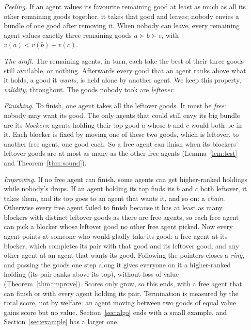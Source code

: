 \documentclass[runningheads,11pt]{llncs}
\begin{document}
\emph{Peeling.} If an agent values its favourite remaining good at least as much as all its other remaining goods together, it takes that good and leaves; nobody envies a bundle of one good after removing it. When nobody can leave, every remaining agent values exactly three remaining goods $a\succ b\succ c$, with $v(a)<v(b)+v(c)$.

\emph{The draft.} The remaining agents, in turn, each take the best of their three goods still available, or nothing. Afterwards every good that an agent ranks above what it holds, a good it \emph{wants}, is held alone by another agent. We keep this property, \emph{validity}, throughout. The goods nobody took are \emph{leftover}.

\emph{Finishing.} To finish, one agent takes all the leftover goods. It must be \emph{free}: nobody may want its good. The only agents that could still envy its big bundle are its \emph{blockers}: agents holding their top good $a$ whose $b$ and $c$ would both be in it. Each blocker is fixed by moving one of these two goods, which is leftover, to another free agent, one good each. So a free agent can finish when its blockers' leftover goods are at most as many as the other free agents (Lemma~\ref{lem:test} and Theorem~\ref{thm:sound}).

\emph{Improving.} If no free agent can finish, some agents can get higher-ranked holdings while nobody's drops. If an agent holding its top finds its $b$ and $c$ both leftover, it takes them, and its top goes to an agent that wants it, and so on: a \emph{chain}. Otherwise every free agent failed to finish because it has at least as many blockers with distinct leftover goods as there are free agents, so each free agent can pick a blocker whose leftover good no other free agent picked. Now every agent points at someone who would gladly take its good: a free agent at its blocker, which completes its pair with that good and its leftover good, and any other agent at an agent that wants its good. Following the pointers closes a \emph{ring}, and passing the goods one step along it gives everyone on it a higher-ranked holding (its pair ranks above its top), without loss of value (Theorem~\ref{thm:improve}). Scores only grow, so this ends, with a free agent that can finish or with every agent holding its pair. Termination is measured by the total score, not by welfare: an agent moving between two goods of equal value gains score but no value. Section~\ref{sec:algo} ends with a small example, and Section~\ref{sec:example} has a larger one.
\end{document}
